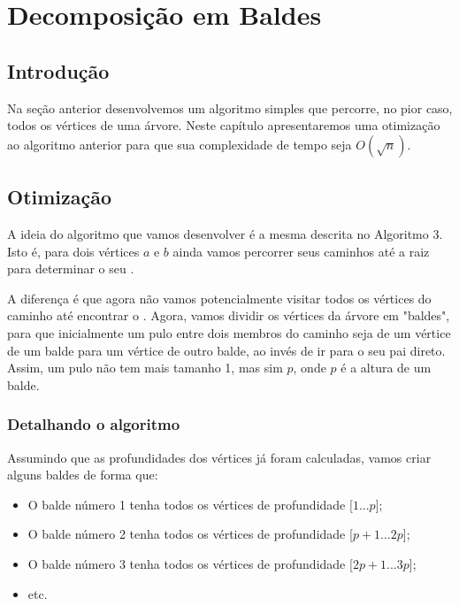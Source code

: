 \chapter{Decomposição em Baldes}
\label{cap:decomp-raiz}

\section{Introdução}

Na seção anterior desenvolvemos um algoritmo simples que percorre, no pior caso, todos os vértices de uma árvore. Neste capítulo apresentaremos uma otimização ao algoritmo anterior para que sua complexidade de tempo seja $O(\sqrt{n})$.

\section{Otimização}

A ideia do algoritmo que vamos desenvolver é a mesma descrita no Algoritmo 3. Isto é, para dois vértices $a$ e $b$ ainda vamos percorrer seus caminhos até a raiz para determinar o seu \LCA.

A diferença é que agora não vamos potencialmente visitar todos os vértices do caminho até encontrar o \LCA. Agora, vamos dividir os vértices da árvore em "baldes", para que inicialmente um pulo entre dois membros do caminho seja de um vértice de um balde para um vértice de outro balde, ao invés de ir para o seu pai direto. Assim, um pulo não tem mais tamanho 1, mas sim $p$, onde $p$ é a altura de um balde.

\subsection{Detalhando o algoritmo}

Assumindo que as profundidades dos vértices já foram calculadas, vamos criar alguns baldes de forma que:

\begin{itemize}
    \item O balde número 1 tenha todos os vértices de profundidade [$1$...$p$];
    \item O balde número 2 tenha todos os vértices de profundidade [$p+1$...$2p$];
    \item O balde número 3 tenha todos os vértices de profundidade [$2p+1$...$3p$];
    \item etc.
\end{itemize}

